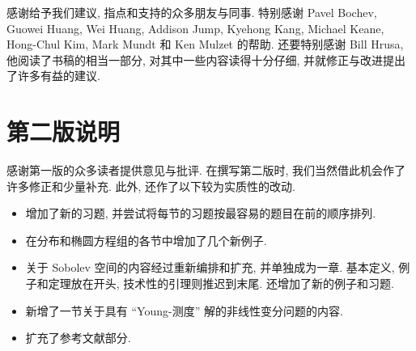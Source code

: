感谢给予我们建议, 指点和支持的众多朋友与同事. 特别感谢 Pavel Bochev, Guowei Huang, Wei Huang, Addison Jump, Kyehong Kang, Michael Keane, Hong-Chul Kim, Mark Mundt 和 Ken Mulzet 的帮助. 还要特别感谢 Bill Hrusa, 他阅读了书稿的相当一部分, 对其中一些内容读得十分仔细, 并就修正与改进提出了许多有益的建议.

\section*{第二版说明}\label{sec:second-edition-notes}

感谢第一版的众多读者提供意见与批评. 在撰写第二版时, 我们当然借此机会作了许多修正和少量补充. 此外, 还作了以下较为实质性的改动.

\begin{itemize}
\item 增加了新的习题, 并尝试将每节的习题按最容易的题目在前的顺序排列.
\item 在分布和椭圆方程组的各节中增加了几个新例子.
\item 关于 Sobolev 空间的内容经过重新编排和扩充, 并单独成为一章. 基本定义, 例子和定理放在开头, 技术性的引理则推迟到末尾. 还增加了新的例子和习题.
\item 新增了一节关于具有 ``Young-测度'' 解的非线性变分问题的内容.
\item 扩充了参考文献部分.
\end{itemize}
